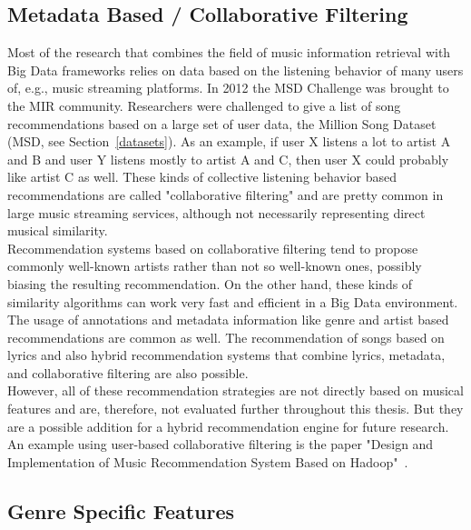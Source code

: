 \subsection{Metadata Based / Collaborative Filtering}\label{collaborative}

Most of the research that combines the field of music information retrieval with Big Data frameworks relies on data based on the listening behavior of many users of, e.g., music streaming platforms. In 2012 the MSD Challenge was brought to the MIR community. Researchers were challenged to give a list of song recommendations based on a large set of user data, the Million Song Dataset (MSD, see Section~\ref{datasets}). As an example, if user X listens a lot to artist A and B and user Y listens mostly to artist A and C, then user X could probably like artist C as well. These kinds of collective listening behavior based recommendations are called "collaborative filtering" and are pretty common in large music streaming services, although not necessarily representing direct musical similarity.~\cite[pp. 192f.]{knees1}\\
Recommendation systems based on collaborative filtering tend to propose commonly well-known artists rather than not so well-known ones, possibly biasing the resulting recommendation. On the other hand, these kinds of similarity algorithms can work very fast and efficient in a Big Data environment. The usage of annotations and metadata information like genre and artist based recommendations are common as well. The recommendation of songs based on lyrics and also hybrid recommendation systems that combine lyrics, metadata, and collaborative filtering are also possible.\\
However, all of these recommendation strategies are not directly based on musical features and are, therefore, not evaluated further throughout this thesis. But they are a possible addition for a hybrid recommendation engine for future research. 
An example using user-based collaborative filtering is the paper "Design and Implementation of Music Recommendation System Based on Hadoop"~\cite{metadat1}. 

\subsection{Genre Specific Features}

